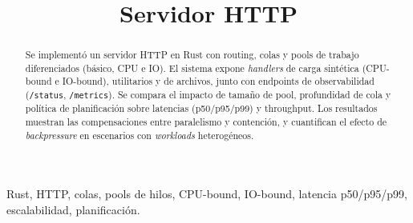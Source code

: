 \documentclass[conference]{IEEEtran}
\begin{document}
\title{Servidor HTTP}

\author{  \and {}  }

\maketitle

\begin{abstract}
Se implementó un servidor HTTP en Rust con routing, colas y pools de trabajo diferenciados (básico, CPU e IO). El sistema expone \textit{handlers} de carga sintética (CPU-bound e IO-bound), utilitarios y de archivos, junto con endpoints de observabilidad (\texttt{/status}, \texttt{/metrics}). Se compara el impacto de tamaño de pool, profundidad de cola y política de planificación sobre latencias (p50/p95/p99) y throughput. Los resultados muestran las compensaciones entre paralelismo y contención, y cuantifican el efecto de \textit{backpressure} en escenarios con \textit{workloads} heterogéneos.
\end{abstract}

\begin{IEEEkeywords}
Rust, HTTP, colas, pools de hilos, CPU-bound, IO-bound, latencia p50/p95/p99, escalabilidad, planificación.
\end{IEEEkeywords}
\end{document}
